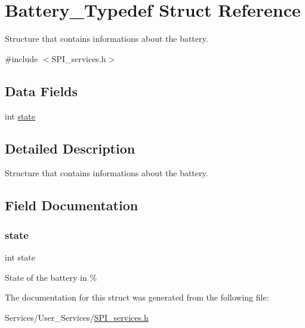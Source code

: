 \hypertarget{struct_battery___typedef}{}\section{Battery\+\_\+\+Typedef Struct Reference}
\label{struct_battery___typedef}


Structure that contains informations about the battery.  




{\ttfamily \#include $<$S\+P\+I\+\_\+services.\+h$>$}

\subsection*{Data Fields}
\begin{DoxyCompactItemize}
\item 
int \hyperlink{struct_battery___typedef_a89f234133d3efe315836311cbf21c64b}{state}
\end{DoxyCompactItemize}


\subsection{Detailed Description}
Structure that contains informations about the battery. 

\subsection{Field Documentation}
\mbox{\label{struct_battery___typedef_a89f234133d3efe315836311cbf21c64b}} 
\subsubsection{\texorpdfstring{state}{state}}
{\footnotesize\ttfamily int state}

State of the battery in \% 

The documentation for this struct was generated from the following file\+:\begin{DoxyCompactItemize}
\item 
Services/\+User\+\_\+\+Services/\hyperlink{_s_p_i__services_8h}{S\+P\+I\+\_\+services.\+h}\end{DoxyCompactItemize}
